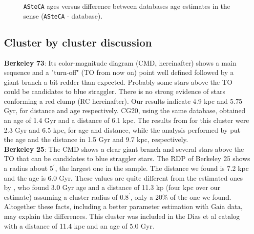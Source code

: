 \documentclass[draft]{aa}
\begin{document}
  \begin{figure}
   \caption{\texttt{ASteCA} ages versus difference between databases age
   estimates in the sense (\texttt{ASteCA} - database).}
   \label{fig:ages}
  \end{figure}



 \subsection{Cluster by cluster discussion}
 \label{ssec:indiv_clusters}


\textbf{Berkeley 73}: Its color-magnitude diagram (CMD, hereinafter) shows
a main sequence and a "turn-off" (TO from now on) point
well defined followed by a giant branch a bit redder than expected.
Probably some stars above the TO could be candidates to blue straggler.
There is no strong evidence of stars conforming a red clump (RC hereinafter).
Our results indicate 4.9 kpc and 5.75 Gyr, for distance and age
respectively. CG20, using the same database, obtained an age
of 1.4 Gyr and a distance of 6.1 kpc. The results from \cite{Ortolani_2005}
for this cluster were 2.3 Gyr and 6.5 kpc, for age and distance, while the analysis
performed by \cite{Carraro_2005} put the age and the distance in 1.5 Gyr
and 9.7 kpc, respectively.\\

\textbf{Berkeley 25}: The CMD shows a clear giant branch and several stars
above the TO that can be candidates to blue straggler stars. The RDP of
Berkeley 25 shows a radius about $5^{\prime}$, the largest one in the sample.
The distance we found is 7.2 kpc and the
age is 6.0 Gyr. These values are quite different from the estimated
ones by \cite{Carraro_2005}, who found 3.0 Gyr age and
a distance  of 11.3 kp (four kpc over our estimate) assuming a cluster radius
of $0.8^{\prime}$, only a 20\% of the one we found. Altogether these facts,
including a better parameter estimation with Gaia data, may explain the
differences. This cluster was included in the Dias et al catalog
with a distance of 11.4 kpc and an age of 5.0 Gyr.\\
\end{document}
